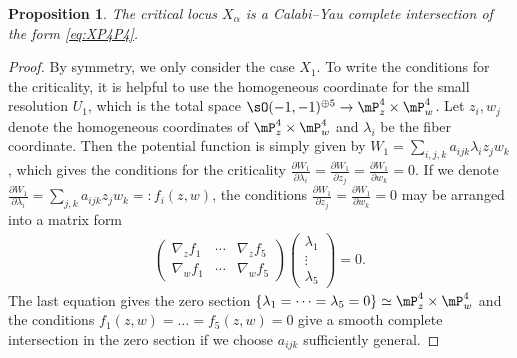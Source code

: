 \documentclass[10pt,a4paper]{amsart}
\numberwithin{equation}{section}
\newtheorem{Proposition}[Theorem]{Proposition}
\begin{document}
\begin{Proposition}The critical locus $X_{\alpha}$ is a Calabi--Yau complete intersection of the form \eqref{eq:XP4P4}.
\end{Proposition}
\begin{proof} By symmetry, we only consider the case $X_{1}$. To write the conditions for the criticality, it is helpful to use the homogeneous coordinate for the small resolution $U_{1}$, which is the total space $\sO(-1,-1)^{\oplus5}\to\mP_{z}^{4}\times\mP_{w}^{4}$. Let $z_{i},w_{j}$ denote the homogeneous coordinates of $\mP_{z}^{4}\times\mP_{w}^{4}$ and $\lambda_{i}$ be the fiber coordinate. Then the potential function is simply given by $W_{1}=\sum_{i,j,k}a_{ijk}\lambda_{i}z_{j}w_{k}$, which gives the conditions for the criticality $\frac{\partial W_{1}}{\partial\lambda_{i}}=\frac{\partial W_{1}}{\partial z_{j}}=\frac{\partial W_{1}}{\partial w_{k}}=0$. If we denote $\frac{\partial W_{1}}{\partial\lambda_{i}}=\sum_{j,k}a_{ijk}z_{j}w_{k}=:f_{i}(z,w)$, the conditions $\frac{\partial W_{1}}{\partial z_{j}}=\frac{\partial W_{1}}{\partial w_{k}}=0$ may be arranged into a matrix form
\begin{gather*}
\left(\begin{matrix}\nabla_{z}f_{1} & \cdots & \nabla_{z}f_{5}\\
\nabla_{w}f_{1} & \cdots & \nabla_{w}f_{5}
\end{matrix}\right)\left(\begin{smallmatrix}\lambda_{1}\\
\vdots\\
\lambda_{5}
\end{smallmatrix}\right)=0.
\end{gather*}
The last equation gives the zero section $\left\{ \lambda_{1}=\cdots=\lambda_{5}=0\right\} \simeq\mP_{z}^{4}\times\mP_{w}^{4}$
and the conditions $f_{1}(z,w)=\dots =f_{5}(z,w)=0$ give a smooth complete intersection in the zero section if we choose $a_{ijk}$ sufficiently
general. \end{proof}
\end{document}
